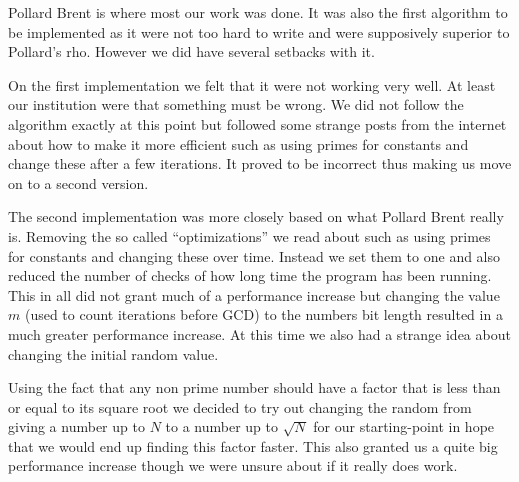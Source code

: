 Pollard Brent is where most our work was done. It was also the first algorithm to be implemented as it were not too hard to write and were supposively superior to Pollard’s rho. However we did have several setbacks with it.

On the first implementation we felt that it were not working very well. At least our institution were that something must be wrong. We did not follow the algorithm exactly at this point but followed some strange posts from the internet about how to make it more efficient such as using primes for constants and change these after a few iterations. It proved to be incorrect thus making us move on to a second version.

The second implementation was more closely based on what Pollard Brent really is. Removing the so called “optimizations” we read about such as using primes for constants and changing these over time. Instead we set them to one and also reduced the number of checks of how long time the program has been running. This in all did not grant much of a performance increase but changing the value $m$ (used to count iterations before GCD) to the numbers bit length resulted in a much greater performance increase. At this time we also had a strange idea about changing the initial random value.

Using the fact that any non prime number should have a factor that is less than or equal to its square root we decided to try out changing the random from giving a number up to $N$ to a number up to $\sqrt{N}$ for our starting-point in hope that we would end up finding this factor faster. This also granted us a quite big performance increase though we were unsure about if it really does work.